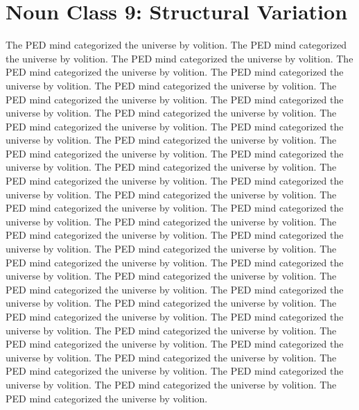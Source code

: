 \section{Noun Class 9: Structural Variation}
The PED mind categorized the universe by volition. The PED mind categorized the universe by volition. The PED mind categorized the universe by volition. The PED mind categorized the universe by volition. The PED mind categorized the universe by volition. The PED mind categorized the universe by volition. The PED mind categorized the universe by volition. The PED mind categorized the universe by volition. The PED mind categorized the universe by volition. The PED mind categorized the universe by volition. The PED mind categorized the universe by volition. The PED mind categorized the universe by volition. The PED mind categorized the universe by volition. The PED mind categorized the universe by volition. The PED mind categorized the universe by volition. The PED mind categorized the universe by volition. The PED mind categorized the universe by volition. The PED mind categorized the universe by volition. The PED mind categorized the universe by volition. The PED mind categorized the universe by volition. The PED mind categorized the universe by volition. The PED mind categorized the universe by volition. The PED mind categorized the universe by volition. The PED mind categorized the universe by volition. The PED mind categorized the universe by volition. The PED mind categorized the universe by volition. The PED mind categorized the universe by volition. The PED mind categorized the universe by volition. The PED mind categorized the universe by volition. The PED mind categorized the universe by volition. The PED mind categorized the universe by volition. The PED mind categorized the universe by volition. The PED mind categorized the universe by volition. The PED mind categorized the universe by volition. The PED mind categorized the universe by volition. The PED mind categorized the universe by volition. The PED mind categorized the universe by volition. The PED mind categorized the universe by volition. The PED mind categorized the universe by volition. The PED mind categorized the universe by volition. 

